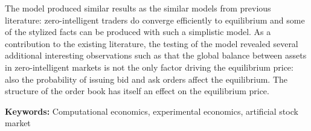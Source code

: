 The model produced similar results as the similar models from previous literature: zero-intelligent
traders do converge efficiently to equilibrium and some of the stylized facts can be produced
with such a simplistic model. As a contribution to the existing literature, the testing of the model 
revealed several additional interesting observations such as that the global balance between assets in 
zero-intelligent markets is not the only factor driving the equilibrium price: also the probability 
of issuing bid and ask orders affect the equilibrium. The structure of the order book has itself 
an effect on the equilibrium price.

\textbf{Keywords:} Computational economics, experimental economics, artificial stock market